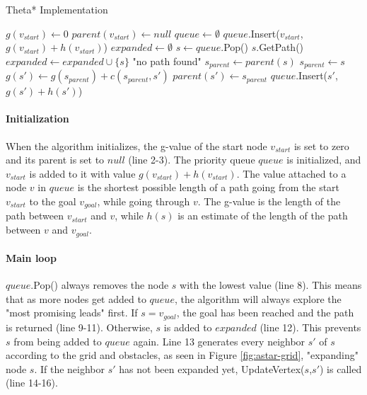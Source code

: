 \begin{algorithm}[h]
\caption{Theta* Implementation}
\label{alg:thetastar}
\begin{algorithmic}[1]
	\State $g(v_{start}) \leftarrow 0$
	\State $parent(v_{start}) \leftarrow null$
	\State $queue \leftarrow \emptyset$
	\State $queue$.Insert($v_{start}$, $g(v_{start}) + h(v_{start})$)
	\State $expanded \leftarrow \emptyset$
		\State $s \leftarrow queue$.Pop()
			\Return $s$.GetPath()
		\EndIf
		\State $expanded \leftarrow expanded \cup \{s\}$
			\EndIf
		\EndFor
	\EndWhile
	\Return "no path found"
\EndFunction
{}
		\State $s_{parent} \leftarrow parent(s)$
	\Else
		\State $s_{parent} \leftarrow s$	
	\EndIf
		\State $g(s') \leftarrow g(s_{parent}) + c(s_{parent},s')$
		\State $parent(s') \leftarrow s_{parent}$
		\State $queue$.Insert($s'$,$g(s') + h(s')$)
	\EndIf
\EndFunction{}
\end{algorithmic}
\end{algorithm}
\paragraph{Initialization}
When the algorithm initializes, the g-value of the start node $v_{start}$ is set to zero and its parent is set to $null$ (line 2-3). The priority queue $queue$ is initialized, and $v_{start}$ is added to it with value $g(v_{start}) + h(v_{start})$. The value attached to a node $v$ in $queue$ is the shortest possible length of a path going from the start $v_{start}$ to the goal $v_{goal}$, while going through $v$. The g-value is the length of the path between $v_{start}$ and $v$, while $h(s)$ is an estimate of the length of the path between $v$ and $v_{goal}$.
\paragraph{Main loop}
$queue$.Pop() always removes the node $s$ with the lowest value (line 8). This means that as more nodes get added to $queue$, the algorithm will always explore the "most promising leads" first. If $s = v_{goal}$, the goal has been reached and the path is returned (line 9-11). Otherwise, $s$ is added to $expanded$ (line 12). This prevents $s$ from being added to $queue$ again. Line 13 generates every neighbor $s'$ of $s$ according to the grid and obstacles, as seen in Figure \ref{fig:astar-grid}, "expanding" node $s$. If the neighbor $s'$ has not been expanded yet, UpdateVertex($s$,$s'$) is called (line 14-16).

